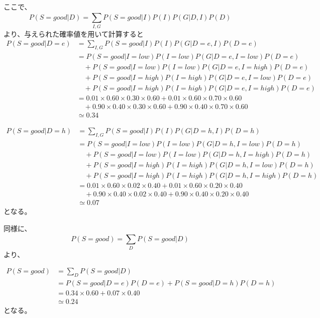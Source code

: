 \documentclass[a4paper,11pt,dvipdfmx]{jsarticle}
\begin{document}
ここで、
\[P(S=good|D) = \sum_{I,G}^{}P(S=good|I)P(I)P(G|D,I)P(D)\]
より、与えられた確率値を用いて計算すると
\begin{align*}
    P(S=good|D = e)    &= \sum_{I,G}^{}P(S=good|I)P(I)P(G|D=e,I)P(D=e)\\
                        &= P(S=good|I = low)P(I = low)P(G|D=e,I = low)P(D=e)\\
                        &\quad + P(S=good|I = low)P(I = low)P(G|D=e,I = high)P(D=e)\\
                        &\quad + P(S=good|I = high)P(I = high)P(G|D=e,I = low)P(D=e)\\
                        &\quad + P(S=good|I = high)P(I = high)P(G|D=e,I = high)P(D=e)\\
                        &= 0.01 \times 0.60 \times 0.30 \times 0.60 + 0.01 \times 0.60 \times 0.70 \times 0.60\\
                        &\quad + 0.90 \times 0.40 \times 0.30 \times 0.60 + 0.90 \times 0.40 \times 0.70 \times 0.60\\
                        &\simeq 0.34
\end{align*}

\begin{align*}
    P(S=good|D = h)    &= \sum_{I,G}^{}P(S=good|I)P(I)P(G|D=h,I)P(D=h)\\
                        &= P(S=good|I = low)P(I = low)P(G|D=h,I = low)P(D=h)\\
                        &\quad + P(S=good|I = low)P(I = low)P(G|D=h,I = high)P(D=h)\\
                        &\quad + P(S=good|I = high)P(I = high)P(G|D=h,I = low)P(D=h)\\
                        &\quad + P(S=good|I = high)P(I = high)P(G|D=h,I = high)P(D=h)\\
                        &= 0.01 \times 0.60 \times 0.02 \times 0.40 + 0.01 \times 0.60 \times 0.20 \times 0.40\\
                        &\quad + 0.90 \times 0.40 \times 0.02 \times 0.40 + 0.90 \times 0.40 \times 0.20 \times 0.40\\
                        &\simeq 0.07
\end{align*}
となる。

同様に、
\[P(S=good) = \sum_{D}^{}P(S=good|D)\]
より、

\begin{align*}
    P(S=good)  &= \sum_{D}^{}P(S=good|D)\\
                &= P(S=good|D=e)P(D=e) + P(S=good|D=h)P(D=h)\\
                &= 0.34 \times 0.60 + 0.07 \times 0.40\\
                &\simeq 0.24
\end{align*}
となる。
\end{document}
